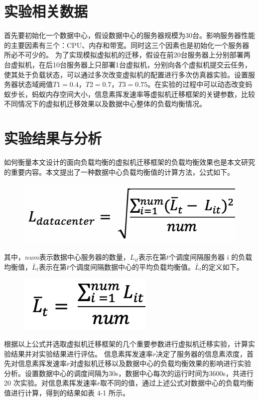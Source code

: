  \section{实验相关数据}
首先要初始化一个数据中心，假设数据中心的服务器规模为30台。影响服务器性能的主要因素有三个：CPU、内存和带宽。同时这三个因素也是初始化一个服务器所必不可少的。
为了实现模拟虚拟机的迁移，假设在前20台服务器上分别部署两台虚拟机，在后10台服务器上只部署1台虚拟机，分别向各个虚拟机提交云任务，使其处于负载状态，可以通过多次改变虚拟机的配置进行多次仿真器实验。设置服务器状态域阙值$ T1 = 0.4 $，$ T2 = 0.7 $，$ T3 = 0.75 $。在实验的过程中可以动态改变蚂蚁步长，蚂蚁内存空间大小，信息素挥发速率等虚拟机迁移框架的关键参数，比较不同情况下的虚拟机迁移效果以及数据中心整体的负载均衡情况。

 \section{实验结果与分析}
如何衡量本文设计的面向负载均衡的虚拟机迁移框架的负载均衡效果也是本文研究的重要内容。本文提出了一种数据中心负载均衡值的计算方法，公式如下。

\begin{figure}[htb]
  \centering
  \includegraphics[width=0.4\linewidth]{./Figure/IMG_Chap4_4.png}
\end{figure}

其中，$ num $表示数据中心服务器的数量，$ L_{it} $表示在第$ t $个调度间隔服务器 i 的负载均衡值，$ \overline{L}_t $表示在第$ t $个调度间隔数据中心的平均负载均衡值。$ \overline{L}_t $的定义如下。

\begin{figure}[htb]
  \centering
  \includegraphics[width=0.2\linewidth]{./Figure/IMG_Chap4_5.png}
\end{figure}

根据以上公式并选取虚拟机迁移框架的几个重要参数进行虚拟机迁移实验，计算实验结果并对实验结果进行评估。
信息素挥发速率$ r $决定了服务器的信息素浓度，首先对信息素挥发速率$ r $对虚拟机迁移以及数据中心的负载均衡效果的影响进行实验分析。设置数据中心的调度间隔为30s，数据中心每次的运行时间为3600s，共进行 20 次实验。对信息素挥发速率$ r $取不同的值，通过上述公式对数据中心的负载均衡值进行计算，得到的结果如表 4-1 所示。

